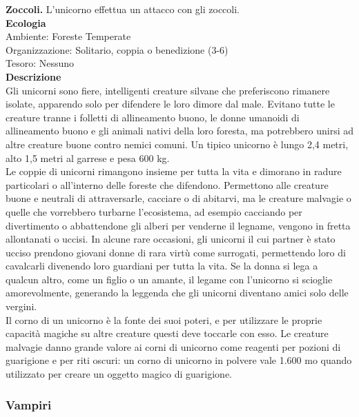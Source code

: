 \begin{multicols}{2}
\textbf{Zoccoli.} L'unicorno effettua un attacco con gli zoccoli.\\
\textbf{Ecologia}\\
Ambiente: Foreste Temperate\\
Organizzazione: Solitario, coppia o benedizione (3-6)\\
Tesoro: Nessuno\\
\textbf{Descrizione}\\
Gli unicorni sono fiere, intelligenti creature silvane che preferiscono rimanere isolate, apparendo solo per difendere le loro dimore dal male. Evitano tutte le creature tranne i folletti di allineamento buono, le donne umanoidi di allineamento buono e gli animali nativi della loro foresta, ma potrebbero unirsi ad altre creature buone contro nemici comuni. Un tipico unicorno è lungo 2,4 metri, alto 1,5 metri al garrese e pesa 600 kg.\\

Le coppie di unicorni rimangono insieme per tutta la vita e dimorano in radure particolari o all’interno delle foreste che difendono. Permettono alle creature buone e neutrali di attraversarle, cacciare o di abitarvi, ma le creature malvagie o quelle che vorrebbero turbarne l’ecosistema, ad esempio cacciando per divertimento o abbattendone gli alberi per venderne il legname, vengono in fretta allontanati o uccisi. In alcune rare occasioni, gli unicorni il cui partner è stato ucciso prendono giovani donne di rara virtù come surrogati, permettendo loro di cavalcarli divenendo loro guardiani per tutta la vita. Se la donna si lega a qualcun altro, come un figlio o un amante, il legame con l’unicorno si scioglie amorevolmente, generando la leggenda che gli unicorni diventano amici solo delle vergini.\\

Il corno di un unicorno è la fonte dei suoi poteri, e per utilizzare le proprie capacità magiche su altre creature questi deve toccarle con esso. Le creature malvagie danno grande valore ai corni di unicorno come reagenti per pozioni di guarigione e per riti oscuri: un corno di unicorno in polvere vale 1.600 mo quando utilizzato per creare un oggetto magico di guarigione.\\

\subsubsection{Vampiri}


\end{multicols}
